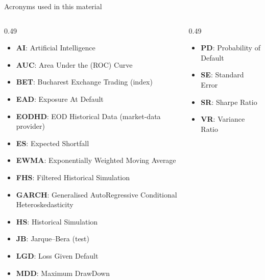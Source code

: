 \begin{frame}{Acronyms used in this material}
\begin{columns}[T]
\begin{column}{0.49\textwidth}
\begin{itemize}\setlength{\itemsep}{0pt}
    \item \textbf{AI}: Artificial Intelligence
    \item \textbf{AUC}: Area Under the (ROC) Curve
    \item \textbf{BET}: Bucharest Exchange Trading (index)
    \item \textbf{EAD}: Exposure At Default
    \item \textbf{EODHD}: EOD Historical Data (market-data provider)
    \item \textbf{ES}: Expected Shortfall
    \item \textbf{EWMA}: Exponentially Weighted Moving Average
    \item \textbf{FHS}: Filtered Historical Simulation
    \item \textbf{GARCH}: Generalised AutoRegressive Conditional Heteroskedasticity
    \item \textbf{HS}: Historical Simulation
    \item \textbf{JB}: Jarque–Bera (test)
    \item \textbf{LGD}: Loss Given Default
    \item \textbf{MDD}: Maximum DrawDown
\end{itemize}
\end{column}
\begin{column}{0.49\textwidth}
\begin{itemize}\setlength{\itemsep}{0pt}
    \item \textbf{PD}: Probability of Default
    \item \textbf{SE}: Standard Error
    \item \textbf{SR}: Sharpe Ratio
    \item \textbf{VR}: Variance Ratio
\end{itemize}
\end{column}
\end{columns}
\end{frame}

